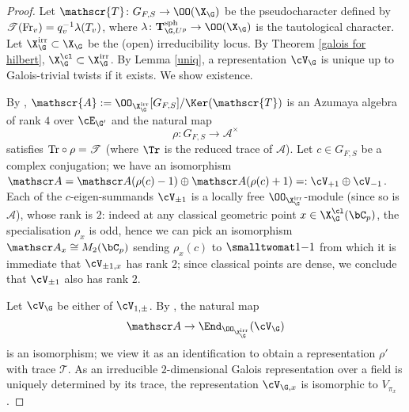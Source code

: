 \begin{proof}
Let $\mathscr{T}\colon G_{F, S}\to \OO(\X_{\G})$ be the pseudocharacter defined by $\mathscr{T}({\rm Fr}_{v})=q_{v}^{-1}\lambda(T_{v})$, where $\lambda\colon {\bf T}_{\G, U^{p}}^{\rm sph}\to \OO(\X_{\G})$ is the tautological character. Let $\X_{\G}  ^{\rm irr}\subset \X_{\G}$ be the (open) irreducibility locus. By Theorem \ref{galois for hilbert}, $\X_{\G}^{\cl}\subset \X_{\G}^{\rm irr}$. By Lemma \ref{uniq}, a representation $\cV_{\G}$ is unique up to Galois-trivial twists if it exists. We show existence.


By \cite[Theorem 5.1]{rou}, $\mathscr{A}:=\OO_{\X_{\G}^{\rm irr}}[G_{F, S}]/ \Ker(\mathscr{T})$ is an Azumaya algebra of rank $4$ over $\cE_{\G'}$ and the natural map
$$\rho\colon G_{F,S}\to \mathscr{A}^{\times}$$ satisfies ${\rm Tr}\circ \rho= \mathscr{T}$ (where $\Tr$ is the reduced trace of $\mathscr A$). Let $c\in G_{F, S}$ be a complex conjugation; we have an isomorphism $\mathscr A={\mathscr A} (\rho(c)-1)\oplus {\mathscr A}(\rho(c)+1)=:\cV_{+1}\oplus \cV_{-1}$. Each of the $c$-eigen-summands $\cV_{\pm1}$ is a locally free $\OO_{\X_{\G}^{\rm irr}}$-module (since so is $\mathscr A$), whose rank is  $2$: indeed at any classical geometric point  $x\in \X_{\G}^{\cl}(\bC_{p})$, the specialisation $\rho_{x}$ is odd, hence we can pick an isomorphism ${\mathscr A}_{x}\cong M_{2}(\bC_{p})$ sending $\rho_{x}(c)$ to $\smalltwomat 1{}{}{-1}$ from which it is immediate that $\cV_{\pm 1, x}$ has rank $2$; since classical points are dense, we conclude that $\cV_{\pm 1}$ also has rank $2$.

 Let $\cV_{\G}$ be either of $\cV_{\rm 1, \pm}$. By \cite[Corollary 2.9 (a)]{saltman}, the natural map
 $${\mathscr A}\to \End_{\OO_{\X^{\rm irr}_{\G}}}(\cV_{\G})$$
 is an isomorphism; we view it as an identification to obtain a representation $\rho'$ with trace $\mathscr{T}$. As an irreducible  $2$-dimensional Galois representation over a field is uniquely determined by its trace, the representation $\cV_{\G, x}$ is isomorphic to $V_{\pi_{x}}$.



\end{proof}
